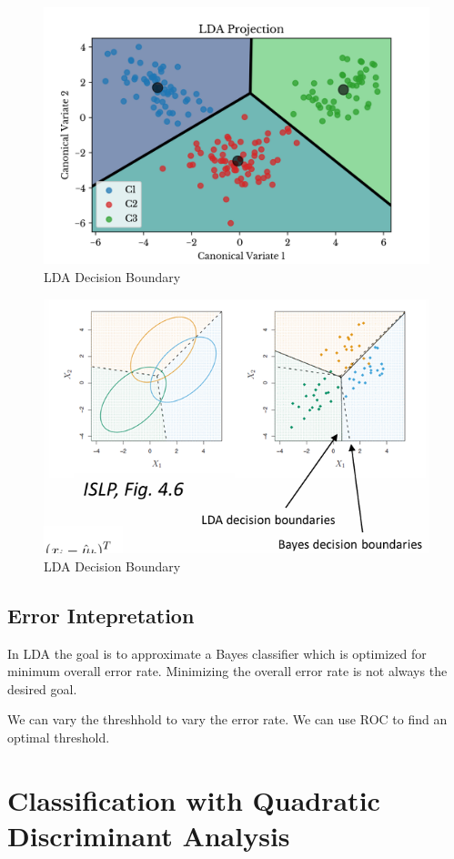 \documentclass[../Main.tex]{subfiles}
\begin{document}
\begin{figure}[H]
    \centering
    \includegraphics[width=0.75\linewidth]{Images/lda-dec-boundary.png}
    \caption{LDA Decision Boundary}
\end{figure}

\begin{figure}[H]
    \centering
    \includegraphics[width=0.75\linewidth]{Images/lda-dec-boundary-2.png}
    \caption{LDA Decision Boundary}
\end{figure}

\subsection{Error Intepretation}
In LDA the goal is 
to approximate a Bayes classifier which is 
optimized for minimum overall error rate.
Minimizing the overall error rate is not always the desired goal.

We can vary the threshhold to vary the error rate. We can use ROC
to find an optimal threshold.

\newpage
\section{Classification with Quadratic Discriminant Analysis}
\end{document}
